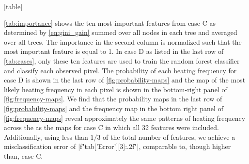 \py[manager_ml]|table|

\autoref{tab:importance} shows the ten most important features from case C as determined by \autoref{eq:gini_gain} summed over all nodes in each tree and averaged over all trees.
The importance in the second column is normalized such that the most important feature is equal to 1.
In case D as listed in the last row of \autoref{tab:cases}, only these ten features are used to train the random forest classifier and classify each observed pixel.
The probability of each heating frequency for case D is shown in the last row of \autoref{fig:probability-maps} and the map of the most likely heating frequency in each pixel is shown in the bottom-right panel of \autoref{fig:frequency-maps}.
We find that the probability maps in the last row of \autoref{fig:probability-maps} and the frequency map in the bottom right panel of \autoref{fig:frequency-maps} reveal approximately the same patterns of heating frequency across the \AR{} as the maps for case C in which all 32 features were included.
Additionally, using less than $1/3$ of the total number of features, we achieve a misclassification error of \py[manager_ml]|f"{tab['Error'][3]:.2f}"|, comparable to, though higher than, case C.


